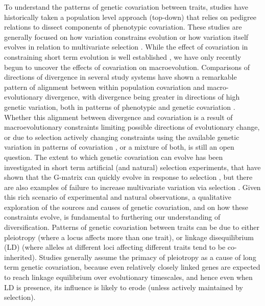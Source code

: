 \begin{refsection}
To understand the patterns of genetic covariation between traits,
studies have historically taken a population level approach (top-down)
that relies on pedigree relations to dissect components of phenotypic
covariation. These studies are generally focused on how
variation constrains evolution or how variation itself evolves in
relation to multivariate selection \parencite{Arnold2008-pc,Futuyma2010-jl}.
While the effect of covariation in constraining short
term evolution is well established \parencite{Lande1979-by,Grant1995-er,Schluter1996-gw}
, we have only recently begun to uncover the effects of covariation on macroevolution. Comparisons of
directions of divergence in several study systems have shown a
remarkable pattern of alignment between within population covariation
and macro-evolutionary divergence, with divergence being greater in
directions of high genetic variation, both in patterns of phenotypic
\parencite{Marroig2005-ce,Punzalan2016-lb,Simon2016-ed} and genetic
covariation \parencite{Houle2017-ph,McGlothlin2018-hm}. Whether this alignment between
divergence and covariation is a result of macroevolutionary constraints
limiting possible directions of evolutionary change, or due to selection
actively changing constraints using the available genetic variation in
patterns of covariation \parencite{Arnold2001-lz,Pavlicev2011-xm,Pavlicev2015-up,Walter2018-dw},
or a mixture of both, is still an open question. The extent to
which genetic covariation can evolve has been investigated in short term
artificial (and natural) selection experiments, that have shown that the
G-matrix can quickly evolve in response to selection \parencite{Careau2015-sy,Assis2016-vz,Penna2017-if},
but there are also
examples of failure to increase multivariate variation via selection \parencite{Sztepanacz2017-ot}.
Given this rich scenario of experimental and natural observations, a
qualitative exploration of the sources and causes of genetic
covariation, and on how these constraints evolve, is fundamental to
furthering our understanding of diversification. Patterns of genetic
covariation between traits can be due to either pleiotropy (where a
locus affects more than one trait), or linkage disequilibrium (LD)
(where alleles at different loci affecting different traits tend to be
co-inherited). Studies generally assume the primacy of pleiotropy as
a cause of long term genetic covariation, because even relatively
closely linked genes are expected to reach linkage equilibrium over
evolutionary timescales, and hence even when LD is presence, its
influence is likely to erode (unless actively maintained by selection).


\end{refsection}
